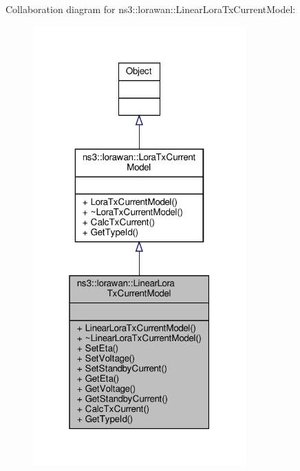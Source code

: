 Collaboration diagram for ns3\+:\+:lorawan\+:\+:Linear\+Lora\+Tx\+Current\+Model\+:
\nopagebreak
\begin{figure}[H]
\begin{center}
\leavevmode
\includegraphics[width=232pt]{classns3_1_1lorawan_1_1LinearLoraTxCurrentModel__coll__graph}
\end{center}
\end{figure}
